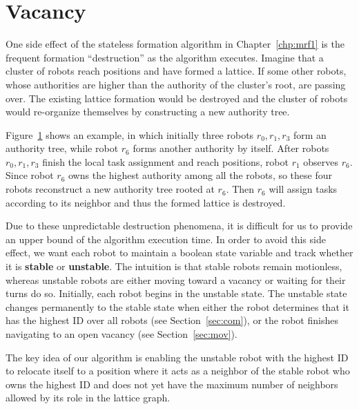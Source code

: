 \section{Vacancy}
\label{sec:vacancy}
One side effect of the stateless formation algorithm in Chapter~\ref{chp:mrf1} is the frequent formation ``destruction'' as the algorithm executes. 
%
Imagine that a cluster of robots reach positions and have formed 
a lattice.
If some other robots, whose authorities are higher than the authority of the cluster's root, are passing over. 
The existing lattice formation would be destroyed and the cluster of robots would re-organize themselves by constructing a new authority tree.


Figure~\ref{fig:destruction} shows an example, in which initially three robots $r_0, r_1, r_3$ form an authority tree, while robot $r_6$ forms another authority by itself.
%
After robots $r_0, r_1, r_3$ finish the local task assignment and reach positions, robot $r_1$ observes $r_6$.
%
Since robot $r_6$ owns the highest authority among all the robots, so these four robots reconstruct a new authority tree rooted at $r_6$. Then $r_6$ will assign tasks according to its neighbor and thus the formed lattice is destroyed.

\begin{figure}
\centering  

\label{fig:destruction}
\end{figure}

Due to these unpredictable destruction phenomena, it is difficult for us to provide 
an upper bound of the algorithm execution time. 
%
In order to avoid this side effect, we want each robot to maintain a boolean state variable 
and track whether it is \textbf{stable} or \textbf{unstable}.  
%
The intuition is that stable robots remain motionless, whereas unstable robots
are either moving toward a vacancy or waiting for their turns do so.
%
Initially, each robot begins in the unstable state.
%
The unstable state changes permanently to the stable state when either the robot determines
that it has the highest ID over all robots (see Section~\ref{sec:com}), or the
robot finishes navigating to an open vacancy (see Section~\ref{sec:mov}).


The key idea of our algorithm is enabling the unstable robot with the highest ID to relocate itself 
to a position where it acts as a neighbor of the stable robot who owns the highest ID 
and does not yet have the maximum number of neighbors allowed by its role in the
lattice graph.

